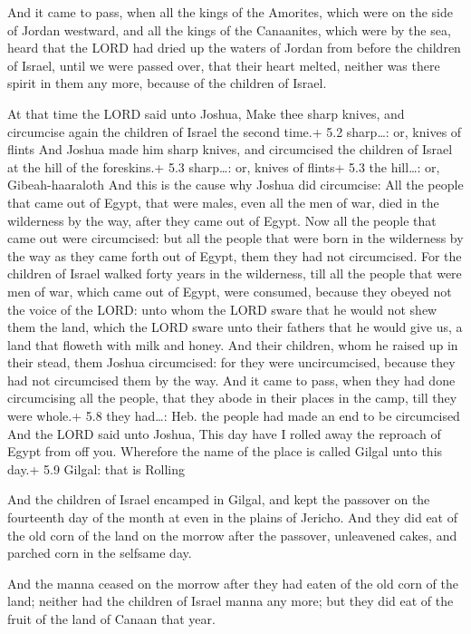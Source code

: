  And it came to pass, when all the kings of the Amorites,
which were on the side of Jordan westward, and all the kings of the
Canaanites, which were by the sea, heard that the LORD had dried up the
waters of Jordan from before the children of Israel, until we were
passed over, that their heart melted, neither was there spirit in them
any more, because of the children of Israel.

 At that time the LORD said unto Joshua, Make thee sharp
knives, and circumcise again the children of Israel the second time.+
5.2 sharp\ldots: or, knives of flints  And Joshua made him
sharp knives, and circumcised the children of Israel at the hill of the
foreskins.+ 5.3 sharp\ldots: or, knives of flints+ 5.3 the hill\ldots:
or, Gibeah-haaraloth  And this is the cause why Joshua did
circumcise: All the people that came out of Egypt, that were males, even
all the men of war, died in the wilderness by the way, after they came
out of Egypt.  Now all the people that came out were
circumcised: but all the people that were born in the wilderness by the
way as they came forth out of Egypt, them they had not circumcised.
 For the children of Israel walked forty years in the
wilderness, till all the people that were men of war, which came out of
Egypt, were consumed, because they obeyed not the voice of the LORD:
unto whom the LORD sware that he would not shew them the land, which the
LORD sware unto their fathers that he would give us, a land that floweth
with milk and honey.  And their children, whom he raised up
in their stead, them Joshua circumcised: for they were uncircumcised,
because they had not circumcised them by the way.  And it
came to pass, when they had done circumcising all the people, that they
abode in their places in the camp, till they were whole.+ 5.8 they
had\ldots: Heb. the people had made an end to be circumcised
 And the LORD said unto Joshua, This day have I rolled away
the reproach of Egypt from off you. Wherefore the name of the place is
called Gilgal unto this day.+ 5.9 Gilgal: that is Rolling

 And the children of Israel encamped in Gilgal, and kept
the passover on the fourteenth day of the month at even in the plains of
Jericho.  And they did eat of the old corn of the land on
the morrow after the passover, unleavened cakes, and parched corn in the
selfsame day.

 And the manna ceased on the morrow after they had eaten
of the old corn of the land; neither had the children of Israel manna
any more; but they did eat of the fruit of the land of Canaan that year.

